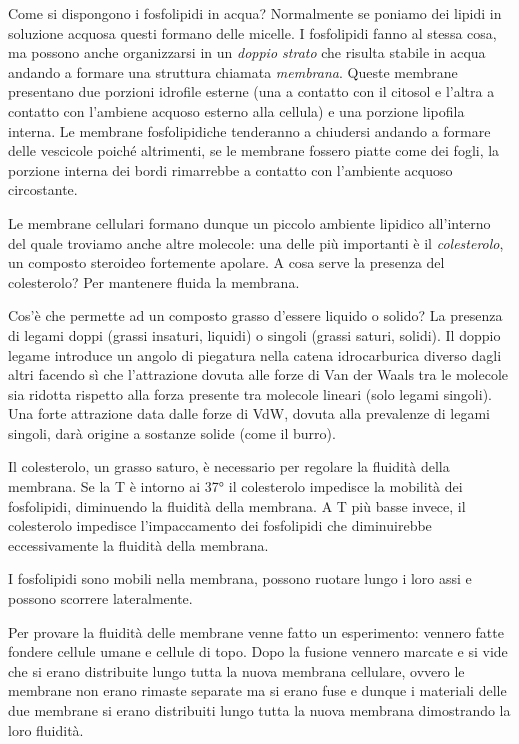 \documentclass[]{article}
\begin{document}
Come si dispongono i fosfolipidi in acqua? Normalmente se poniamo dei
lipidi in soluzione acquosa questi formano delle micelle. I fosfolipidi
fanno al stessa cosa, ma possono anche organizzarsi in un \emph{doppio
strato} che risulta stabile in acqua andando a formare una struttura
chiamata \emph{membrana}. Queste membrane presentano due porzioni
idrofile esterne (una a contatto con il citosol e l'altra a contatto con
l'ambiene acquoso esterno alla cellula) e una porzione lipofila interna.
Le membrane fosfolipidiche tenderanno a chiudersi andando a formare
delle vescicole poiché altrimenti, se le membrane fossero piatte come
dei fogli, la porzione interna dei bordi rimarrebbe a contatto con
l'ambiente acquoso circostante.

Le membrane cellulari formano dunque un piccolo ambiente lipidico
all'interno del quale troviamo anche altre molecole: una delle più
importanti è il \emph{colesterolo}, un composto steroideo fortemente
apolare. A cosa serve la presenza del colesterolo? Per mantenere fluida
la membrana.

Cos'è che permette ad un composto grasso d'essere liquido o solido? La
presenza di legami doppi (grassi insaturi, liquidi) o singoli (grassi
saturi, solidi). Il doppio legame introduce un angolo di piegatura nella
catena idrocarburica diverso dagli altri facendo sì che l'attrazione
dovuta alle forze di Van der Waals tra le molecole sia ridotta rispetto
alla forza presente tra molecole lineari (solo legami singoli). Una
forte attrazione data dalle forze di VdW, dovuta alla prevalenze di
legami singoli, darà origine a sostanze solide (come il burro).

Il colesterolo, un grasso saturo, è necessario per regolare la fluidità
della membrana. Se la T è intorno ai 37° il colesterolo impedisce la
mobilità dei fosfolipidi, diminuendo la fluidità della membrana. A T più
basse invece, il colesterolo impedisce l'impaccamento dei fosfolipidi
che diminuirebbe eccessivamente la fluidità della membrana.

I fosfolipidi sono mobili nella membrana, possono ruotare lungo i loro
assi e possono scorrere lateralmente.

Per provare la fluidità delle membrane venne fatto un esperimento:
vennero fatte fondere cellule umane e cellule di topo. Dopo la fusione
vennero marcate e si vide che si erano distribuite lungo tutta la nuova
membrana cellulare, ovvero le membrane non erano rimaste separate ma si
erano fuse e dunque i materiali delle due membrane si erano distribuiti
lungo tutta la nuova membrana dimostrando la loro fluidità.
\end{document}
